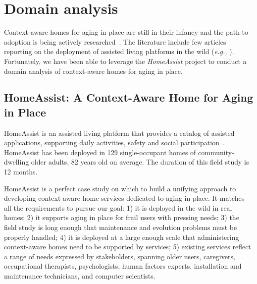 \section{Domain analysis}
Context-aware homes for aging in place are still in their infancy and the path to adoption is being actively researched~\cite{kaye2017making}. The literature include few articles reporting on the deployment of assisted living platforms in the wild ({\em e.g.,} \cite{kaye2011intelligent}). Fortunately, we have been able to leverage the {\em HomeAssist} project to conduct a domain analysis of context-aware homes for aging in place. 

\subsection{HomeAssist: A Context-Aware Home for Aging in Place}
HomeAssist is an assisted living platform that provides a catalog of assisted applications, supporting daily activities, safety and social participation~\cite{consel2017homeassist}. HomeAssist has been deployed in 129 single-occupant homes of community-dwelling older adults, 82 years old on average. The duration of this field study is 12 months.

HomeAssist is a perfect case study on which to build a unifying approach to developing context-aware home services dedicated to aging in place. It matches all the requirements to pursue our goal: 1) it is deployed in the wild in real homes; 2) it supports aging in place for frail users with pressing needs; 3) the field study is long enough that maintenance and evolution problems must be properly handled; 4) it is deployed at a large enough scale that administering context-aware homes need to be supported by services; 5) existing services reflect a range of needs expressed by stakeholders, spanning older users, caregivers, occupational therapists, psychologists, human factors experts, installation and maintenance technicians, and computer scientists.

